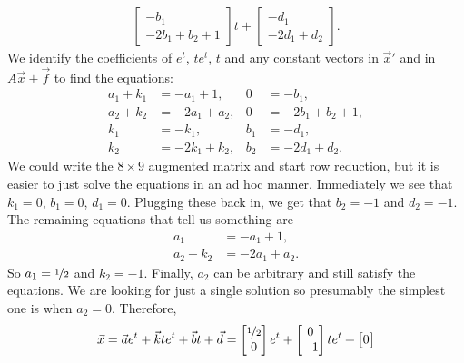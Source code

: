 \documentclass{ximera}
\begin{document}
\begin{exampleSol}
\begin{equation*}
\begin{split}
            \begin{bmatrix}
                -b_1 \\ 
                -2b_1+b_2+1
            \end{bmatrix}
            t +
            \begin{bmatrix}
                -d_1 \\ 
                -2d_1+d_2
            \end{bmatrix} .
        \end{split}
    \end{equation*}
    We identify the coefficients of $e^t$, $te^t$, $t$ and any constant vectors in $\vec{x}'$ and in $A\vec{x}+\vec{f}$ to find the equations:
    \begin{align*}
        a_1+k_1 & = -a_1+1 , & 0 & = -b_1 , \\
        a_2+k_2 & = -2a_1+a_2 , & 0 & = -2b_1+b_2 + 1 , \\
        k_1 & = -k_1 , & b_1 & = -d_1 , \\
        k_2 & = -2k_1+k_2 , & b_2 & = -2d_1+d_2 .
    \end{align*}
    We could write the $8 \times 9$ augmented matrix and start row reduction, but it is easier to just solve the equations in an ad hoc manner. Immediately we see that $k_1 = 0$, $b_1 = 0$, $d_1 = 0$.  Plugging these back in, we get that $b_2 = -1$ and $d_2 = -1$.  The remaining equations that tell us something are
    \begin{align*}
        a_1 & = -a_1+1 , \\
        a_2+k_2 & = -2a_1+a_2 .
    \end{align*}
    So $a_1 = \nicefrac{1}{2}$ and $k_2 = -1$.  Finally, $a_2$ can be arbitrary and still satisfy the equations.  We are looking for just a single solution so presumably the simplest one is when $a_2 = 0$. Therefore,
    \begin{equation*}
        \vec{x} =  \vec{a} e^{t} + \vec{k} t e^{t} + \vec{b} t + \vec{d} =
        \begin{bmatrix}
            \nicefrac{1}{2} \\ 
            0
        \end{bmatrix}
        e^t +
        \begin{bmatrix}
            0 \\ 
            -1
        \end{bmatrix}
        te^t +
        \begin{bmatrix}
            0 \\ 

\end{bmatrix}
\end{equation*}
\end{exampleSol}
\end{document}
